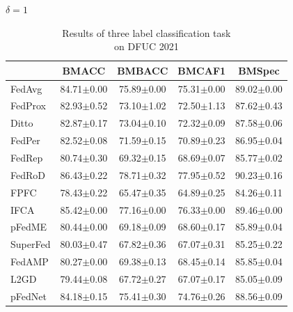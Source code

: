 \documentclass[journal]{IEEEtran}
\begin{document}
\begin{table}
	\centering
	\scriptsize
	\caption{Results of three label classification task\\ on DFUC 2021} 
	\label{table_dfuc_classification}
	
	\begin{subtable}[]{$\delta=1$}
		\begin{tabular}{@{}lcccl@{}}
			\toprule
			& BMACC                   & BMBACC                  & BMCAF1                  & \multicolumn{1}{c}{BMSpec} \\ \midrule
			FedAvg   & 84.71$\pm$0.00          & 75.89$\pm$0.00          & 75.31$\pm$0.00          & 89.02$\pm$0.00             \\
			FedProx  & 82.93$\pm$0.52          & 73.10$\pm$1.02          & 72.50$\pm$1.13          & 87.62$\pm$0.43             \\
			Ditto    & 82.87$\pm$0.17          & 73.04$\pm$0.10          & 72.32$\pm$0.09          & 87.58$\pm$0.06             \\
			FedPer   & 82.52$\pm$0.08          & 71.59$\pm$0.15          & 70.89$\pm$0.23          & 86.95$\pm$0.04             \\
			FedRep   & 80.74$\pm$0.30          & 69.32$\pm$0.15          & 68.69$\pm$0.07          & 85.77$\pm$0.02             \\
			FedRoD   & 86.43$\pm$0.22          & 78.71$\pm$0.32          & 77.95$\pm$0.52          & 90.23$\pm$0.16             \\
			FPFC     & 78.43$\pm$0.22          & 65.47$\pm$0.35          & 64.89$\pm$0.25          & 84.26$\pm$0.11             \\
			IFCA     & 85.42$\pm$0.00          & 77.16$\pm$0.00          & 76.33$\pm$0.00          & 89.46$\pm$0.00             \\
			pFedME   & 80.44$\pm$0.00          & 69.18$\pm$0.09          & 68.60$\pm$0.17          & 85.89$\pm$0.04             \\
			SuperFed & 80.03$\pm$0.47          & 67.82$\pm$0.36          & 67.07$\pm$0.31          & 85.25$\pm$0.22             \\
			FedAMP   & 80.27$\pm$0.00          & 69.38$\pm$0.13          & 68.45$\pm$0.14          & 85.85$\pm$0.04             \\
			L2GD     & 79.44$\pm$0.08          & 67.72$\pm$0.27          & 67.07$\pm$0.17          & 85.05$\pm$0.09             \\
			pFedNet  & 84.18$\pm$0.15          & 75.41$\pm$0.30          & 74.76$\pm$0.26          & 88.56$\pm$0.09             \\

\end{tabular}
\end{subtable}
\end{table}
\end{document}
